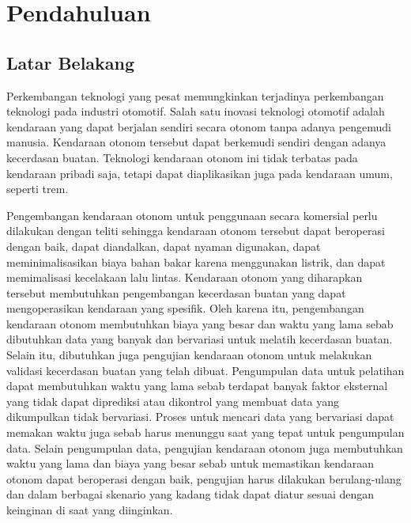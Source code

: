 \chapter{Pendahuluan}


\section{Latar Belakang}

Perkembangan teknologi yang pesat memungkinkan terjadinya perkembangan teknologi
pada industri otomotif. Salah satu inovasi teknologi otomotif adalah kendaraan
yang dapat berjalan sendiri secara otonom tanpa adanya pengemudi manusia.
Kendaraan otonom tersebut dapat berkemudi sendiri dengan adanya kecerdasan
buatan. Teknologi kendaraan otonom ini tidak terbatas pada kendaraan pribadi
saja, tetapi dapat diaplikasikan juga pada kendaraan umum, seperti trem.

Pengembangan kendaraan otonom untuk penggunaan secara komersial perlu dilakukan
dengan teliti sehingga kendaraan otonom tersebut dapat beroperasi dengan baik,
dapat diandalkan, dapat nyaman digunakan, dapat meminimalisasikan biaya bahan
bakar karena menggunakan listrik, dan dapat memimalisasi kecelakaan lalu lintas.
Kendaraan otonom yang diharapkan tersebut membutuhkan pengembangan kecerdasan
buatan yang dapat mengoperasikan kendaraan yang spesifik. Oleh karena itu,
pengembangan kendaraan otonom membutuhkan biaya yang besar dan waktu yang lama
sebab dibutuhkan data yang banyak dan bervariasi untuk melatih kecerdasan
buatan. Selain itu, dibutuhkan juga pengujian kendaraan otonom untuk melakukan
validasi kecerdasan buatan yang telah dibuat. Pengumpulan data untuk pelatihan
dapat membutuhkan waktu yang lama sebab terdapat banyak faktor eksternal yang
tidak dapat diprediksi atau dikontrol yang membuat data yang dikumpulkan tidak
bervariasi. Proses untuk mencari data yang bervariasi dapat memakan waktu juga
sebab harus menunggu saat yang tepat untuk pengumpulan data. Selain pengumpulan
data, pengujian kendaraan otonom juga membutuhkan waktu yang lama dan biaya yang
besar sebab untuk memastikan kendaraan otonom dapat beroperasi dengan baik,
pengujian harus dilakukan berulang-ulang dan dalam berbagai skenario yang kadang
tidak dapat diatur sesuai dengan keinginan di saat yang diinginkan.

